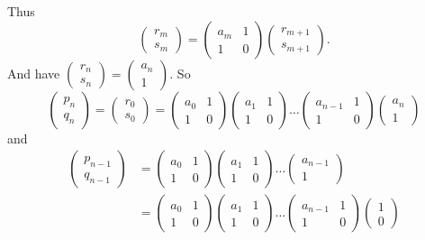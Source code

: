 \documentclass[a4paper, 10pt, twocolumn]{amsart}
\theoremstyle{definition}
\newcommand{\1}{\mathbbm{1}}
\begin{document}
Thus \[\begin{pmatrix} r_m \\ s_m \end{pmatrix} = \begin{pmatrix} a_m & 1 \\ 1 & 0 \end{pmatrix} \begin{pmatrix} r_{m+1} \\ s_{m+1} \end{pmatrix}.\]
And have $\begin{pmatrix} r_n \\ s_n \end{pmatrix} = \begin{pmatrix} a_n \\ 1\end{pmatrix}$. So \[\begin{pmatrix} p_n \\ q_n \end{pmatrix} =\begin{pmatrix}
    r_0 \\s_0
\end{pmatrix} = \begin{pmatrix} a_0 & 1 \\ 1 & 0 \end{pmatrix} \begin{pmatrix} a_1 & 1 \\ 1 & 0 \end{pmatrix} \ldots \begin{pmatrix} a_{n-1} & 1 \\ 1 & 0 \end{pmatrix} \begin{pmatrix} a_n \\ 1 \end{pmatrix} \]
and
\begin{align*}
    \begin{pmatrix} p_{n-1}\\q_{n-1} \end{pmatrix} &= \begin{pmatrix} a_0 & 1 \\ 1 & 0 \end{pmatrix} \begin{pmatrix} a_1 & 1 \\ 1 & 0 \end{pmatrix} \ldots \begin{pmatrix} a_{n-1} \\ 1 \end{pmatrix} \\
&= \begin{pmatrix} a_0 & 1 \\ 1 & 0 \end{pmatrix} \begin{pmatrix} a_1 & 1 \\ 1 & 0 \end{pmatrix} \ldots \begin{pmatrix} a_{n-1} & 1 \\ 1 & 0 \end{pmatrix} \begin{pmatrix}  1 \\  0 \end{pmatrix} 
\end{align*}
\end{document}
